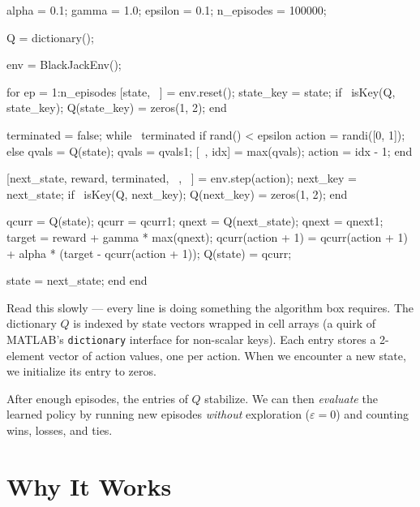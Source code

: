 \documentclass[../../book.tex]{subfiles}
\begin{document}
\begin{code}
alpha = 0.1;       %
gamma = 1.0;       %
epsilon = 0.1;     %
n_episodes = 100000;

Q = dictionary();

env = BlackJackEnv();

for ep = 1:n_episodes
    [state, ~] = env.reset();
    state_key = {state};
    if ~isKey(Q, state_key);  Q(state_key) = {zeros(1, 2)};  end

    terminated = false;
    while ~terminated
        if rand() < epsilon
            action = randi([0, 1]);
        else
            qvals = Q({state});
            qvals = qvals{1};
            [~, idx] = max(qvals);
            action = idx - 1;     %
        end

        [next_state, reward, terminated, ~, ~] = env.step(action);
        next_key = {next_state};
        if ~isKey(Q, next_key);  Q(next_key) = {zeros(1, 2)};  end

        qcurr = Q({state});         qcurr = qcurr{1};
        qnext = Q({next_state});    qnext = qnext{1};
        target = reward + gamma * max(qnext);
        qcurr(action + 1) = qcurr(action + 1) + alpha * (target - qcurr(action + 1));
        Q({state}) = {qcurr};

        state = next_state;
    end
end
\end{code}

\noindent Read this slowly --- every line is doing something the algorithm box requires.  The dictionary $Q$ is indexed by state vectors wrapped in cell arrays (a quirk of MATLAB's \lstinline{dictionary} interface for non-scalar keys).  Each entry stores a 2-element vector of action values, one per action.  When we encounter a new state, we initialize its entry to zeros.

After enough episodes, the entries of $Q$ stabilize.  We can then \emph{evaluate} the learned policy by running new episodes \emph{without} exploration ($\varepsilon = 0$) and counting wins, losses, and ties.

\section{Why It Works}
\end{document}

